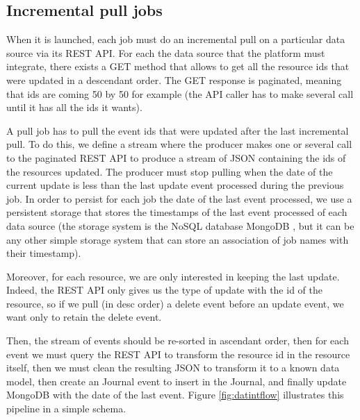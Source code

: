 \subsection{Incremental pull jobs}

When it is launched, each job must do an incremental pull on a particular data source via its REST API. For each the data source that the platform must integrate, there exists
a GET method that allows to get all the resource ids that were updated in a descendant order. The GET response is paginated, meaning that ids are coming 50 by 50 for example (the 
API caller has to make several call until it has all the ids it wants). 

A pull job has to pull the event ids that were updated after the last incremental pull. To do this, we define a stream where the producer makes one or several call to the
paginated REST API to produce a stream of JSON containing the ids of the resources updated. The producer must stop pulling when the date of the current update is less than the last
update event processed during the previous job. In order to persist for each job the date of the last event processed, we use a persistent storage that stores the timestamps of the last event processed of each data source (the storage system is the NoSQL database MongoDB , but it can be any other simple storage system that can store an association of job names with their timestamp).

Moreover, for each resource, we are only interested in keeping the last update. Indeed, the REST API only gives us the type of update with the id of the resource, so if we pull (in desc order) a delete event before an update event, we want only to retain the delete event.

Then, the stream of events should be re-sorted in ascendant order, then for each event we must query the REST API to transform the resource id in the resource itself, then we must clean the resulting JSON to transform it to a known data model, then create an Journal event to insert in the Journal, and finally update MongoDB with the date of the last event.
Figure \ref{fig:datintflow} illustrates this pipeline in a simple schema. 

